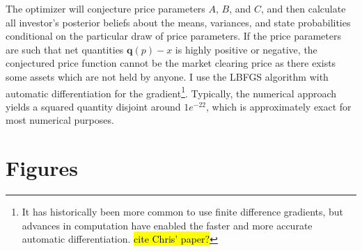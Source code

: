 \documentclass{article}
\begin{document}
The optimizer will conjecture price parameters $A$, $B$, and $C$, and then calculate all investor's posterior beliefs about the means, variances, and state probabilities conditional on the particular draw of price parameters. If the price parameters are such that net quantities $\mathbf{q}(p) - x$ is highly positive or negative, the conjectured price function cannot be the market clearing price as there exists some assets which are not held by anyone. I use the LBFGS algorithm with automatic differentiation for the gradient\footnote{It has historically been more common to use finite difference gradients, but advances in computation have enabled the faster and more accurate automatic differentiation. \hl{cite Chris' paper?}}. Typically, the numerical approach yields a squared quantity disjoint around $1e^{-22}$, which is approximately exact for most numerical purposes.

\appendix
\pagebreak

\section{Figures}
\end{document}

